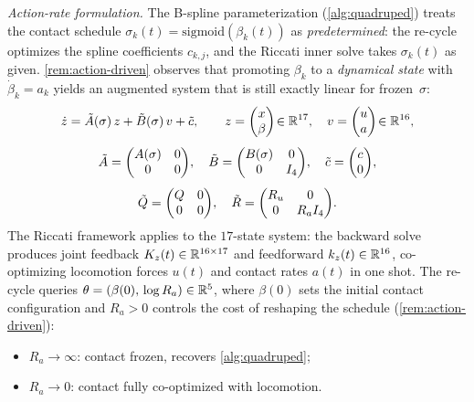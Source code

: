 \newpage
\noindent\emph{Action-rate formulation.}
The B-spline parameterization (\cref{alg:quadruped}) treats
the contact schedule $\sigma_k(t) = \mathrm{sigmoid}(\beta_k(t))$ as
\emph{predetermined}: the re-cycle optimizes the spline coefficients
$c_{k,j}$, and the Riccati inner solve takes $\sigma_k(t)$ as given.
\cref{rem:action-driven} observes that promoting $\beta_k$ to a
\emph{dynamical state} with $\dot\beta_k = a_k$ yields an augmented
system that is still exactly linear for frozen~$\sigma$:
\begin{gather}
\label{eq:augmented-dynamics}
\dot{z} = \tilde{A}(\sigma)\,z + \tilde{B}(\sigma)\,v + \tilde{c},
\qquad
z = \begin{pmatrix} x \\ \beta \end{pmatrix}\!\in \mathbb{R}^{17},
\quad
v = \begin{pmatrix} u \\ a \end{pmatrix}\!\in \mathbb{R}^{16},
\\[4pt]
\notag
\tilde{A} = \begin{pmatrix} A(\sigma) & 0 \\ 0 & 0 \end{pmatrix}\!,
\quad
\tilde{B} = \begin{pmatrix} B(\sigma) & 0 \\ 0 & I_4 \end{pmatrix}\!,
\quad
\tilde{c} = \begin{pmatrix} c \\ 0 \end{pmatrix}\!,
\\[4pt]
\notag
\tilde{Q} = \begin{pmatrix} Q & 0 \\ 0 & 0 \end{pmatrix}\!,
\quad
\tilde{R} = \begin{pmatrix} R_u & 0 \\ 0 & R_a I_4 \end{pmatrix}\!.
\end{gather}
The Riccati framework applies to the $17$-state system:
the backward solve produces joint feedback
$K_z(t) \in \mathbb{R}^{16 \times 17}$ and feedforward $k_z(t) \in \mathbb{R}^{16}$,
co-optimizing locomotion forces $u(t)$ and contact rates $a(t)$ in
one shot.
The re-cycle queries $\theta = (\beta(0),\, \log R_a) \in \mathbb{R}^5$,
where $\beta(0)$ sets the initial contact configuration and
$R_a > 0$ controls the cost of reshaping the schedule
(\cref{rem:action-driven}):
\begin{itemize}[nosep]
\item $R_a \to \infty$: contact frozen, recovers
  \cref{alg:quadruped};
\item $R_a \to 0$: contact fully co-optimized with locomotion.
\end{itemize}

